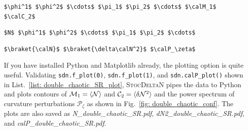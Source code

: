 \documentclass[aps, prd
, preprint
, nofootinbib 
, notitlepage
, superscriptaddress
, longbibliography
]{revtex4-1}
\newcommand{\calC}{\mathcal{C}}
\newcommand{\calM}{\mathcal{M}}
\newcommand{\calN}{\mathcal{N}}
\newcommand{\calP}{\mathcal{P}}
\begin{document}
\vfill

\begin{lstlisting}[numbers = none, mathescape, caption={\textit{Mn\_}$\braket{\text{model name}}$\textit{.dat} : 
contour data of $\calM_n=\braket{\calN^n}$ and $\calC_2=\braket{\delta\calN^2}$}, label = list: Mn_double_chaotic_SR.dat]
$\phi^1$ $\phi^2$ $\cdots$ $\pi_1$ $\pi_2$ $\cdots$ $\calM_1$ $\calC_2$
\end{lstlisting}

\begin{lstlisting}[numbers = none, mathescape, caption={\textit{traj\_}$\braket{\text{model name}}$\textit{.dat} : trajectory data of one sample path}, 
label = list: traj_double_chaotic_SR.dat]
$N$ $\phi^1$ $\phi^2$ $\cdots$ $\pi_1$ $\pi_2$ $\cdots$
\end{lstlisting}

\begin{lstlisting}[numbers = none, mathescape, caption={\textit{calP\_}$\braket{\text{model name}}$\textit{.dat} : data related to curvature perturbation}, 
label = list: calP_double_chaotic_SR.dat]
$\braket{\calN}$ $\braket{\delta\calN^2}$ $\calP_\zeta$
\end{lstlisting}

If you have installed Python and Matplotlib already, the plotting option is quite useful.
Validating \texttt{sdn.f\_plot(0)}, \texttt{sdn.f\_plot(1)}, and \texttt{sdn.calP\_plot()} shown in List.~\ref{list: double_chaotic_SR_plot},
\textsc{StocDeltaN} pipes the data to Python and plots contours of $\calM_1=\braket{\calN}$ and $\calC_2=\braket{\delta\calN^2}$ 
and the power spectrum of curvature perturbations $\calP_\zeta$ as shown in
Fig.~\ref{fig: double_chaotic_conf}. The plots are also saved as \textit{N\_double\_chaotic\_SR.pdf}, \textit{dN2\_double\_chaotic\_SR.pdf}, and
\textit{calP\_double\_chaotic\_SR.pdf}.
\end{document}
